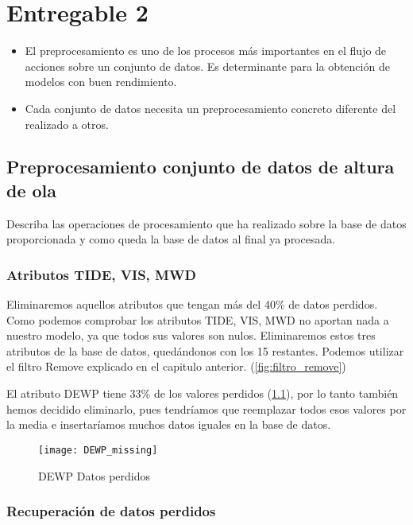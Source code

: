 \chapter{Entregable 2}

\begin{itemize}
	\item El preprocesamiento es uno de los procesos más importantes en el flujo de acciones sobre un conjunto de datos. Es determinante para la obtención de modelos con buen rendimiento.
	\item Cada conjunto de datos necesita un preprocesamiento concreto diferente del realizado a otros.
\end{itemize}

\section{Preprocesamiento conjunto de datos de altura de ola}

Describa las operaciones de procesamiento que ha realizado sobre la base de datos proporcionada y como queda la base de datos al final ya procesada.

\subsection{Atributos TIDE, VIS, MWD}
Eliminaremos aquellos atributos que tengan más del 40\% de datos perdidos.
Como podemos comprobar los atributos TIDE, VIS, MWD no aportan nada a nuestro modelo, ya que todos sus valores son nulos. Eliminaremos estos tres atributos de la base de datos, quedándonos con los 15 restantes. Podemos utilizar el filtro Remove explicado en el capitulo anterior. (\ref{fig:filtro_remove})


El atributo DEWP tiene 33\% de los valores perdidos (\ref{fig:DEWP_missing}), por lo tanto también hemos decidido eliminarlo, pues tendríamos que reemplazar todos esos valores por la media e insertaríamos muchos datos iguales en la base de datos.

\begin{figure}[H]
	\centering
	\texttt{[image: DEWP\_missing]}
    \caption{DEWP Datos perdidos}
    \label{fig:DEWP_missing}
\end{figure}

\subsection{Recuperación de datos perdidos}

